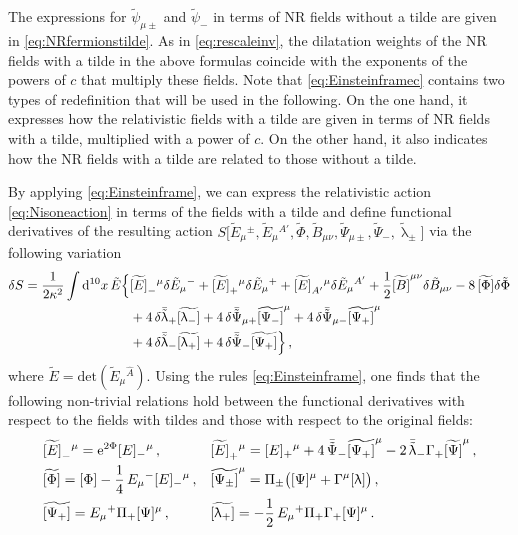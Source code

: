 \documentclass[a4paper,10pt,openany]{article}
\def\rme{\mathrm{e}}
\def\rmd{\mathrm{d}}
\begin{document}
	The expressions for $\tilde{\psi}_{\mu \pm}$ and $\tilde{\psi}_-$ in terms of NR fields without a tilde are given in \eqref{eq:NRfermionstilde}. As in \eqref{eq:rescaleinv}, the dilatation weights of the NR fields with a tilde in the above formulas coincide with the exponents of the powers of $c$ that multiply these fields. Note that \eqref{eq:Einsteinframec} contains two types of redefinition that will be used in the following. On the one hand, it expresses how the relativistic fields with a tilde are given in terms of NR fields with a tilde, multiplied with a power of $c$. On the other hand, it also indicates how the NR fields with a tilde are related to those without a tilde.
	
	By applying \eqref{eq:Einsteinframe}, we can express the relativistic action \eqref{eq:Nisoneaction} in terms of the fields with a tilde and define functional derivatives of the resulting action $S\big[\tilde E_\mu{}^\pm,\tilde E_\mu{}^{A'},\tilde \Phi,\tilde B_{\mu\nu},\tilde \Psi_{\mu\pm},\tilde\Psi_{-},\tilde\uplambda_\pm]$ via the following variation
	\begin{align} \label{eq:releom3}
		\delta S = \frac{1}{2\kappa^2}\int \rmd^{10}x\,\tilde E\Big\{ & \widetilde{[E]}_-{}^\mu\delta\tilde E_\mu{}^- + \widetilde{[E]}_+{}^\mu\delta\tilde E_\mu{}^+ + \widetilde{[E]}_{A'}{}^\mu\delta\tilde E_\mu{}^{A'} + \frac12 \widetilde{[B]}^{\mu\nu} \delta \tilde{B}_{\mu\nu} -8\,\widetilde{[\Phi]}\delta\tilde\Phi \notag\\
		&+ 4\,\delta\bar{\tilde \uplambda}_+\widetilde{[\uplambda_-]}  + 4\,\delta\bar{\tilde\Psi}_{\mu+}\widetilde{[\Psi_-]}^\mu + 4\,\delta\bar{\tilde\Psi}_{\mu-}\widetilde{[\Psi_+]}^\mu\notag\\
		&+ 4\,\delta\bar{\tilde \uplambda}_-\widetilde{[\uplambda_+]} + 4\,\delta\bar{\tilde \Psi}_{-}\widetilde{[\Psi_{+}]}\Big\}\,,
	\end{align}
	where $\tilde{E} = \mathrm{det}(\tilde{E}_\mu{}^{\hat{A}})$. Using the rules \eqref{eq:Einsteinframe}, one finds that the following non-trivial relations hold between the functional derivatives with respect to the fields with tildes and those with respect to the original fields:
	\begin{align}
		&\widetilde{[E]}_-{}^\mu = \rme^{2\Phi}[E]_-{}^\mu\,, && \widetilde{[E]}_+{}^\mu = [E]_+{}^\mu + 4\,\bar{\tilde\Psi}_{-}\widetilde{[\Psi_+]}^\mu - 2\,\bar{\tilde\uplambda}_-\Gamma_+\widetilde{[\Psi]}^\mu\,,\notag\\
		&\widetilde{[\Phi]} = [\Phi] - \frac14\,E_\mu{}^-[E]_-{}^\mu\,,&& \widetilde{[\Psi_\pm]}^\mu = \Pi_\pm\big([\Psi]^\mu + \Gamma^\mu[\uplambda]\big)\,,\\
		&\widetilde{[\Psi_{+}]} = E_\mu{}^+\Pi_+[\Psi]^\mu\,, && \widetilde{[\uplambda_+]} = -\frac12\,E_\mu{}^+\Pi_+\Gamma_+[\Psi]^\mu\,.\notag
	\end{align}
\end{document}
